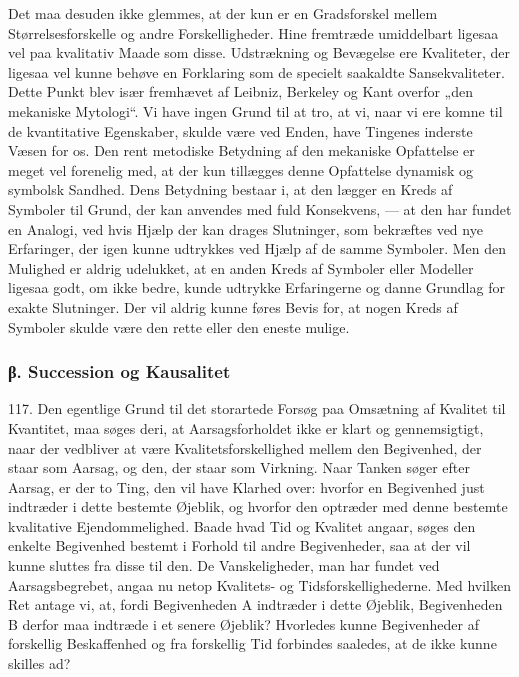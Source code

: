 \documentclass[12pt,a4paper]{book}
\newcommand{\apage}[1]{\marginnote{\footnotesize\textit{[#1]}}}
\begin{document}
Det maa desuden ikke glemmes, at der kun er en Gradsforskel mellem
Størrelsesforskelle og andre Forskelligheder. Hine fremtræde umiddelbart ligesaa vel
paa kvalitativ Maade som disse. Udstrækning og Bevægelse ere Kvaliteter, der ligesaa
vel kunne behøve en Forklaring som de specielt saakaldte Sansekvaliteter. Dette
Punkt blev især fremhævet af Leibniz, Berkeley og Kant overfor
„den mekaniske Mytologi“. Vi have ingen Grund til at tro, at vi, naar vi ere komne
til de kvantitative Egenskaber, skulde være ved Enden, have Tingenes inderste Væsen
for os. Den rent metodiske Betydning af den mekaniske Opfattelse er meget vel
forenelig med, at der kun tillægges denne Opfattelse dynamisk og symbolsk Sandhed.
Dens Betydning bestaar i, at den lægger en Kreds af Symboler til Grund, der kan
anvendes med fuld Konsekvens, --- at den har fundet en Analogi, ved \apage{278} hvis Hjælp der
kan drages Slutninger, som bekræftes ved nye Erfaringer, der igen kunne udtrykkes
ved Hjælp af de samme Symboler. Men den Mulighed er aldrig udelukket, at en anden
Kreds af Symboler eller Modeller ligesaa godt, om ikke bedre, kunde udtrykke
Erfaringerne og danne Grundlag for exakte Slutninger. Der vil aldrig kunne føres
Bevis for, at nogen Kreds af Symboler skulde være den rette eller den eneste mulige.

\subsubsection*{β. Succession og Kausalitet}

117. Den egentlige Grund til det storartede Forsøg paa Omsætning af Kvalitet til
Kvantitet, maa søges deri, at Aarsagsforholdet ikke er klart og gennemsigtigt, naar
der vedbliver at være Kvalitetsforskellighed mellem den Begivenhed, der staar som
Aarsag, og den, der staar som Virkning. Naar Tanken søger efter Aarsag, er der to
Ting, den vil have Klarhed over: hvorfor en Begivenhed just indtræder i dette
bestemte Øjeblik, og hvorfor den optræder med denne bestemte kvalitative
Ejendommelighed. Baade hvad Tid og Kvalitet angaar, søges den enkelte Begivenhed
bestemt i Forhold til andre Begivenheder, saa at der vil kunne sluttes fra disse til
den. De Vanskeligheder, man har fundet ved Aarsagsbegrebet, angaa nu netop Kvalitets-
og Tidsforskellighederne. Med hvilken Ret antage vi, at, fordi Begivenheden A
indtræder i dette Øjeblik, Begivenheden B derfor maa indtræde i et senere Øjeblik?
Hvorledes kunne Begivenheder af forskellig Beskaffenhed og fra forskellig Tid
forbindes saaledes, at de ikke kunne skilles ad?
\end{document}
